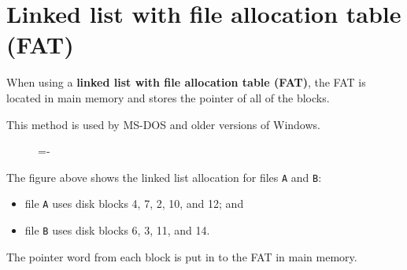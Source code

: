 \documentclass[a4paper]{systems-software}
\begin{document}
\section*{Linked list with file allocation table (FAT)}

When using a \textbf{linked list with file allocation table (FAT)}, the FAT is located in main memory and stores the pointer of all of the blocks.

This method is used by MS-DOS and older versions of Windows.

\begin{figure}[H]
  \lineskip=-\fboxrule
\end{figure}

The figure above shows the linked list allocation for files \texttt{A} and \texttt{B}:
\begin{itemize}
	\item file \texttt{A} uses disk blocks 4, 7, 2, 10, and 12; and
	\item file \texttt{B} uses disk blocks 6, 3, 11, and 14.
\end{itemize}

The pointer word from each block is put in to the FAT in main memory.
\end{document}
